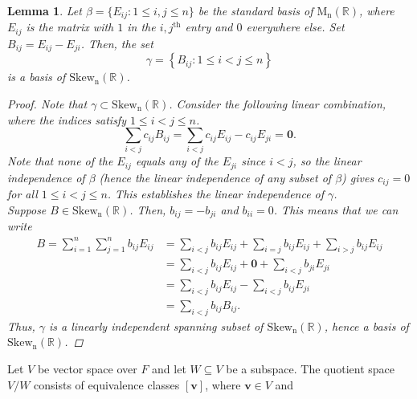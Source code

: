 \documentclass[10pt]{article}
\def\MnR{\operatorname{M_n(\mathbb{R})}}
\def\Skew{\operatorname{Skew_n(\mathbb{R})}}
\def\v{\bm{v}}
\newtheorem{lemma}{Lemma}
\begin{document}
        \begin{lemma}
                Let $\beta = \{E_{ij}\colon 1 \leq i, j \leq n\}$ be the standard basis of $\MnR$, where $E_{ij}$ is the matrix with $1$ in the
                $i, j^\text{th}$ entry and $0$ everywhere else. Set $B_{ij} = E_{ij} - E_{ji}$. Then, the set
                \[
                        \gamma = \left\{B_{ij}\colon 1 \leq i < j \leq n\right\}
                \]
                is a basis of $\Skew$.
                \begin{proof}
                        Note that $\gamma \subset \Skew$.
                        Consider the following linear combination, where the indices satisfy $1 \leq i < j \leq n$.
                        \[
                                \sum_{i < j} c_{ij}B_{ij} = \sum_{i < j} c_{ij} E_{ij} - c_{ij}E_{ji} = \mathbf{0}.
                        \]
                        Note that none of the $E_{ij}$ equals any of the $E_{ji}$ since $i < j$, so the linear independence of $\beta$ (hence
                        the linear independence of any subset of $\beta$) gives $c_{ij} = 0$ for all $1 \leq i < j \leq n$.
                        This establishes the linear independence of $\gamma$.\\
                        Suppose $B \in \Skew$. Then, $b_{ij} = -b_{ji}$ and $b_{ii} = 0$.
                        This means that we can write
                        \begin{align*}
                                B = \sum_{i = 1}^n \sum_{j = 1}^n b_{ij}E_{ij} 
                                        &= \sum_{i < j} b_{ij}E_{ij} + \sum_{i = j}b_{ij}E_{ij} + \sum_{i > j} b_{ij}E_{ij} \\
                                        &= \sum_{i < j} b_{ij}E_{ij} + \mathbf{0} + \sum_{i < j} b_{ji}E_{ji} \\
                                        &= \sum_{i < j} b_{ij}E_{ij} - \sum_{i < j}b_{ij}E_{ji} \\
                                        &= \sum_{i < j} b_{ij}B_{ij}.
                        \end{align*}
                        Thus, $\gamma$ is a linearly independent spanning subset of $\Skew$, hence a basis of $\Skew$.
                \end{proof}
        \end{lemma}
        Let $V$ be vector space over $F$ and let $W\subseteq V$ be a subspace.
        The quotient space $V/W$ consists of equivalence classes $[\v]$, where $\v \in V$ and
\end{document}
